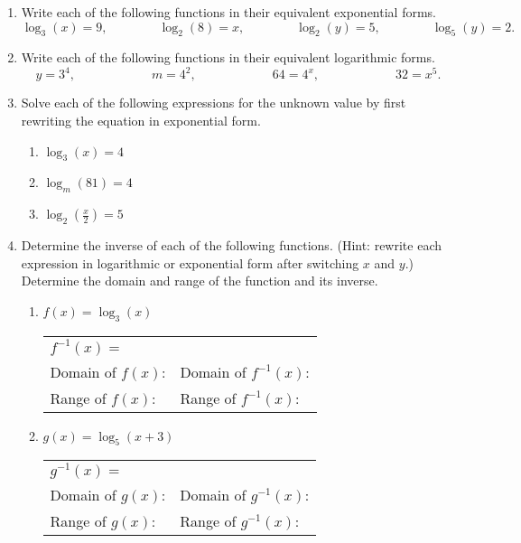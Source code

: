 \begin{enumerate}
\item Write each of the following functions in their equivalent  exponential forms.
  $$\log_3(x)=9,   \quad \quad \quad \quad
  \log_2(8)=x,     \quad \quad \quad \quad
  \log_2(y)=5,     \quad \quad  \quad \quad
  \log_5(y)=2.$$
\vfill
\item Write each of the following functions in their equivalent  logarithmic forms.
  $$y=3^4,  \quad \quad \quad \quad \quad \quad
  m=4^2,    \quad \quad \quad \quad \quad \quad
  64=4^x,   \quad \quad \quad \quad  \quad \quad
  32=x^5.$$
\vfill
\item Solve each of the following expressions for the unknown value by
  first rewriting the equation in exponential form.
\begin{enumerate}
\item $\log_3(x)=4$
\vfill
\vfill
\item $\log_{m}(81)=4$
\vfill
\vfill
\item $\displaystyle \log_2\left(\frac{x}{2}\right)=5$
\vfill
\vfill
\end{enumerate}



\clearpage
\item Determine the inverse of each of the following functions.
  (Hint: rewrite each expression in logarithmic or exponential form
  after switching $x$ and $y$.)  Determine the domain and range of the
  function and its inverse.  
\begin{enumerate}
\item $f(x)=\log_3(x)$

  \vfill
  
  \begin{tabular}{p{}p{}}
    $f^{-1}(x) = $ & \\ [1em]
    Domain of $f(x)$:  & Domain of $f^{-1}(x)$: \\ [1em]
    Range of $f(x)$:   & Range of $f^{-1}(x)$:  \\ [1em]
  \end{tabular}
  
\item $g(x)=\log_5(x+3)$

  \vfill
  
  \begin{tabular}{p{}p{}}
    $g^{-1}(x) = $ & \\ [1em]
    Domain of $g(x)$:  & Domain of $g^{-1}(x)$: \\ [1em]
    Range of $g(x)$:   & Range of $g^{-1}(x)$:  \\ [1em]
  \end{tabular}
  

\end{enumerate}
\end{enumerate}
